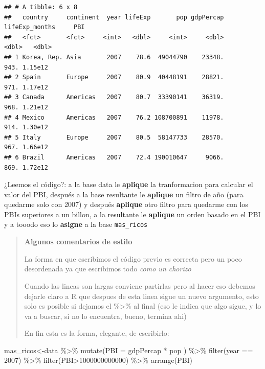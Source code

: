 \documentclass[
]{book}
\newenvironment{Shaded}{\begin{snugshade}}{\end{snugshade}}
\newcommand{\AttributeTok}[1]{\textcolor[rgb]{0.77,0.63,0.00}{#1}}
\newcommand{\DecValTok}[1]{\textcolor[rgb]{0.00,0.00,0.81}{#1}}
\newcommand{\FunctionTok}[1]{\textcolor[rgb]{0.00,0.00,0.00}{#1}}
\newcommand{\NormalTok}[1]{#1}
\newcommand{\OtherTok}[1]{\textcolor[rgb]{0.56,0.35,0.01}{#1}}
\newcommand{\SpecialCharTok}[1]{\textcolor[rgb]{0.00,0.00,0.00}{#1}}
\begin{document}
\begin{verbatim}
## # A tibble: 6 x 8
##   country     continent  year lifeExp       pop gdpPercap lifeExp_months     PBI
##   <fct>       <fct>     <int>   <dbl>     <int>     <dbl>          <dbl>   <dbl>
## 1 Korea, Rep. Asia       2007    78.6  49044790    23348.           943. 1.15e12
## 2 Spain       Europe     2007    80.9  40448191    28821.           971. 1.17e12
## 3 Canada      Americas   2007    80.7  33390141    36319.           968. 1.21e12
## 4 Mexico      Americas   2007    76.2 108700891    11978.           914. 1.30e12
## 5 Italy       Europe     2007    80.5  58147733    28570.           967. 1.66e12
## 6 Brazil      Americas   2007    72.4 190010647     9066.           869. 1.72e12
\end{verbatim}

¿Leemos el código?: a la base data le \textbf{aplique} la tranformacion para calcular el valor del PBI, después a la base resultante le \textbf{aplique} un filtro de año (para quedarme solo con 2007) y después \textbf{aplique} otro filtro para quedarme con los PBIs superiores a un billon, a la resultante le \textbf{aplique} un orden basado en el PBI y a tooodo eso lo \textbf{asigne} a la base \texttt{mas\_ricos}

\begin{quote}
\textbf{Algunos comentarios de estilo }

La forma en que escribimos el código previo es correcta pero un poco desordenada ya que escribimos todo \emph{como un chorizo}

Cuando las lineas son largas conviene partirlas pero al hacer eso debemos dejarle claro a R que despues de esta linea sigue un nuevo argumento, esto solo es posible si dejamos el \%\textgreater\% al final (eso le indica que algo sigue, y lo va a buscar, si no lo encuentra, bueno, termina ahi)

En fin esta es la forma, elegante, de escribirlo:
\end{quote}

\begin{Shaded}
\begin{Highlighting}[]
\NormalTok{mas\_ricos}\OtherTok{\textless{}{-}}\NormalTok{data }\SpecialCharTok{\%\textgreater{}\%} 
  \FunctionTok{mutate}\NormalTok{(}\AttributeTok{PBI =}\NormalTok{ gdpPercap }\SpecialCharTok{*}\NormalTok{ pop ) }\SpecialCharTok{\%\textgreater{}\%} 
  \FunctionTok{filter}\NormalTok{(year }\SpecialCharTok{==} \DecValTok{2007}\NormalTok{) }\SpecialCharTok{\%\textgreater{}\%} 
  \FunctionTok{filter}\NormalTok{(PBI}\SpecialCharTok{\textgreater{}}\DecValTok{1000000000000}\NormalTok{) }\SpecialCharTok{\%\textgreater{}\%} 
  \FunctionTok{arrange}\NormalTok{(PBI)}
\end{Highlighting}
\end{Shaded}
\end{document}
